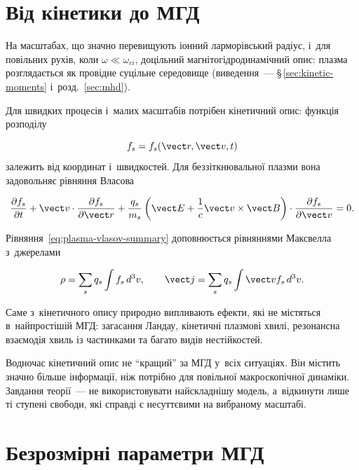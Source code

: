 \section{Від кінетики до МГД}

На масштабах, що значно перевищують іонний ларморівський радіус,
і~для повільних рухів, коли $\omega\ll\omega_{ci}$, доцільний
магнітогідродинамічний опис: плазма розглядається як провідне
суцільне середовище (виведення~--- §\,\ref{sec:kinetic-moments} і~розд.~\ref{sec:mhd}).

Для швидких процесів і~малих масштабів потрібен кінетичний опис:
функція розподілу

\begin{equation*}
f_s=f_s(\vect r,\vect v,t)
\end{equation*}
%
залежить від координат і~швидкостей. Для беззіткнювальної плазми вона
задовольняє рівняння Власова

\begin{equation}
\frac{\partial f_s}{\partial t}
+\vect v\cdot\frac{\partial f_s}{\partial\vect r}
+\frac{q_s}{m_s}
\left(
\vect E+\frac{1}{c}\vect v\times\vect B
\right)
\cdot\frac{\partial f_s}{\partial\vect v}
=0.
\label{eq:plasma-vlasov-summary}
\end{equation}

Рівняння~\eqref{eq:plasma-vlasov-summary} доповнюється рівняннями
Максвелла з~джерелами

\begin{equation*}
\rho=\sum_s q_s\int f_s\,d^3v,
\qquad
\vect j=\sum_s q_s\int\vect v f_s\,d^3v.
\end{equation*}

Саме з~кінетичного опису природно випливають ефекти, які не містяться
в~найпростішій МГД: загасання Ландау, кінетичні плазмові хвилі,
резонансна взаємодія хвиль із частинками та багато видів
нестійкостей.

Водночас кінетичний опис не \enquote{кращий} за МГД у~всіх ситуаціях.
Він містить значно більше інформації, ніж потрібно для повільної
макроскопічної динаміки. Завдання теорії~--- не використовувати
найскладнішу модель, а~відкинути лише ті ступені свободи, які
справді є несуттєвими на вибраному масштабі.

\section{Безрозмірні параметри МГД}

